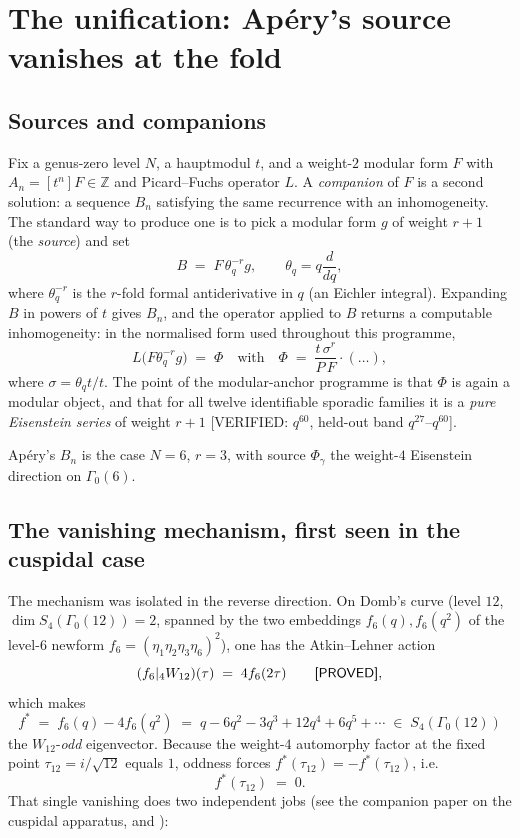 \documentclass[11pt,reqno]{amsart}
\theoremstyle{plain}
\theoremstyle{definition}
\theoremstyle{remark}
\newcommand{\Z}{\mathbb{Z}}
\newcommand{\Ga}{\Gamma_0}
\newcommand{\Proved}{\textup{\textsf{[PROVED]}}}
\newcommand{\VerifiedR}[1]{\textup{\textsf{[VERIFIED: #1]}}}
\begin{document}
\section{The unification: Ap\'ery's source vanishes at the fold}
\label{sec:unification}

\subsection{Sources and companions}

Fix a genus-zero level $N$, a hauptmodul $t$, and a weight-$2$ modular
form $F$ with $A_n=[t^n]F\in\Z$ and Picard--Fuchs operator $L$. A
\emph{companion} of $F$ is a second solution: a sequence $B_n$ satisfying
the same recurrence with an inhomogeneity. The standard way to produce
one is to pick a modular form $g$ of weight $r+1$ (the \emph{source}) and
set
\[
  B \;=\; F\,\theta_q^{-r} g, \qquad \theta_q = q\frac{d}{dq},
\]
where $\theta_q^{-r}$ is the $r$-fold formal antiderivative in $q$
(an Eichler integral). Expanding $B$ in powers of $t$ gives $B_n$, and
the operator applied to $B$ returns a computable inhomogeneity: in the
normalised form used throughout this programme,
\[
  L\bigl(F\theta_q^{-r}g\bigr) \;=\; \Phi\quad\text{with}\quad
  \Phi \;=\; \frac{t\,\sigma^r}{P\,F}\cdot(\dots),
\]
where $\sigma=\theta_q t/t$. The point of the modular-anchor programme is
that $\Phi$ is again a modular object, and that for all twelve
identifiable sporadic families it is a \emph{pure Eisenstein series} of
weight $r+1$ \VerifiedR{$q^{60}$, held-out band $q^{27}$--$q^{60}$}.

Ap\'ery's $B_n$ is the case $N=6$, $r=3$, with source $\Phi_\gamma$ the
weight-$4$ Eisenstein direction on $\Ga(6)$.

\subsection{The vanishing mechanism, first seen in the cuspidal case}

The mechanism was isolated in the reverse direction. On Domb's curve
(level $12$, $\dim S_4(\Ga(12))=2$, spanned by the two embeddings
$f_6(q), f_6(q^2)$ of the level-$6$ newform $f_6=(\eta_1\eta_2\eta_3\eta_6)^2$),
one has the Atkin--Lehner action
\[
  (f_6|_4W_{12})(\tau) \;=\; 4f_6(2\tau) \qquad \Proved,
\]
which makes
\[
  f^{*} \;=\; f_6(q)-4f_6(q^2)\;=\;q-6q^2-3q^3+12q^4+6q^5+\cdots
  \;\in\;S_4(\Ga(12))
\]
the $W_{12}$-\emph{odd} eigenvector. Because the weight-$4$ automorphy
factor at the fixed point $\tau_{12}=i/\sqrt{12}$ equals $1$, oddness
forces $f^{*}(\tau_{12}) = -f^{*}(\tau_{12})$, i.e.
\[
  f^{*}(\tau_{12})\;=\;0 .
\]
That single vanishing does two independent jobs (see the companion paper
on the cuspidal apparatus, and \cite[\S4]{D1}):
\end{document}
